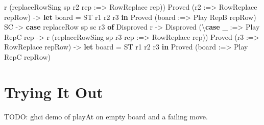 \documentclass[]{article}
\newenvironment{Shaded}{}{}
\newcommand{\DataTypeTok}[1]{\textcolor[rgb]{0.56,0.13,0.00}{#1}}
\newcommand{\KeywordTok}[1]{\textcolor[rgb]{0.00,0.44,0.13}{\textbf{#1}}}
\newcommand{\NormalTok}[1]{#1}
\newcommand{\OperatorTok}[1]{\textcolor[rgb]{0.40,0.40,0.40}{#1}}
\newcommand{\OtherTok}[1]{\textcolor[rgb]{0.00,0.44,0.13}{#1}}
\begin{document}
\begin{Shaded}
\begin{Highlighting}[]
\NormalTok{                        r (replaceRowSing sp r2 rep }\OperatorTok{:=\textgreater{}} \DataTypeTok{RowReplace}\NormalTok{ rep))}
                \DataTypeTok{Proved}\NormalTok{ (r2\textquotesingle{} }\OperatorTok{:=\textgreater{}} \DataTypeTok{RowReplace}\NormalTok{ repRow) }\OtherTok{{-}\textgreater{}}
                    \KeywordTok{let}\NormalTok{ board\textquotesingle{} }\OtherTok{=} \DataTypeTok{ST}\NormalTok{ r1 r2\textquotesingle{} r3}
                    \KeywordTok{in} \DataTypeTok{Proved}\NormalTok{ (board\textquotesingle{} }\OperatorTok{:=\textgreater{}} \DataTypeTok{Play} \DataTypeTok{RepB}\NormalTok{ repRow)}
        \DataTypeTok{SC} \OtherTok{{-}\textgreater{}}
            \KeywordTok{case}\NormalTok{ replaceRow sp sc r3 }\KeywordTok{of}
                \DataTypeTok{Disproved}\NormalTok{ r }\OtherTok{{-}\textgreater{}} \DataTypeTok{Disproved}\NormalTok{ (\textbackslash{}}\KeywordTok{case}
\NormalTok{                    \_ }\OperatorTok{:=\textgreater{}} \DataTypeTok{Play} \DataTypeTok{RepC}\NormalTok{ rep }\OtherTok{{-}\textgreater{}}
\NormalTok{                        r (replaceRowSing sp r3 rep }\OperatorTok{:=\textgreater{}} \DataTypeTok{RowReplace}\NormalTok{ rep))}
                \DataTypeTok{Proved}\NormalTok{ (r3\textquotesingle{} }\OperatorTok{:=\textgreater{}} \DataTypeTok{RowReplace}\NormalTok{ repRow) }\OtherTok{{-}\textgreater{}}
                    \KeywordTok{let}\NormalTok{ board\textquotesingle{} }\OtherTok{=} \DataTypeTok{ST}\NormalTok{ r1 r2 r3\textquotesingle{}}
                    \KeywordTok{in} \DataTypeTok{Proved}\NormalTok{ (board\textquotesingle{} }\OperatorTok{:=\textgreater{}} \DataTypeTok{Play} \DataTypeTok{RepC}\NormalTok{ repRow)}
\end{Highlighting}
\end{Shaded}

\section{Trying It Out}\label{trying-it-out}

TODO: ghci demo of playAt on empty board and a failing move.
\end{document}
